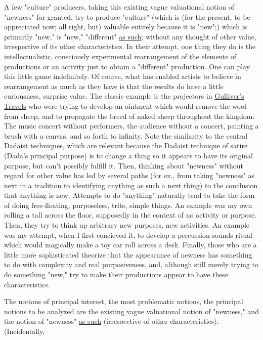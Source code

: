 A few "culture" producers, taking this existing vague
valuational notion of "newness" for granted, try to produce "culture"
(which is (for the present, to be appreciated now; all 
right, but) valuable entirely because it is "new";) which is
primarily "new," is "new," "different" \uline{as such}; without any
thought of other value, irrespective of its other characteristics.
In their attempt, one thing they do is the intellectualistic,
consciously experimental rearrangement of the elements of productions
or an activity just to obtain a "different" production.
One can play this little game indefinitely. Of course, what has
enabled artists to believe in rearrangement as much as they have
is that the results do have a little curiousness, surprise value.
The classic example is the projectors in \uline{Gulliver's Travels} who 
were trying to develop an ointment which would remove the wool
from sheep, and to propagate the breed of naked sheep throughout
the kingdom. The music concert without performers, the audience
without a concert, painting a brush with a canvas, and so forth
to infinity. Note the similarity to the central Dadaist techniques,
which are relevant because the Dadaist technique of satire (Dada's
principal purpose) is to change a thing so it appears to have its
original purpose, but can't possibly fulfill it. Then, thinking
about "newness" without regard for other value has led by several
paths (for ex., from taking "newness" as next in a tradition to
identifying anything as such a next thing) to the conclusion that
anything is new. Attempts to do "anything" naturally tend to take
the form of doing free-floating, purposeless, trite, simple things.
An example was my own rolling a tall across the floor, supposedly 
in the context of no activity or purpose. Then, they try to think
up arbitrary new purposes, new activities. An example was my 
attempt, when I first concieved it, to develop a percussion-sounds
ritual which would magically make a toy car roll across a desk. 
Finally, those who are a little more sophisticated theorize that
the appearance of newness has something to do with complexity and 
real purposiveness, and, although still merely trying to do 
something "new," try to make their productions \uline{appear} to have these characteristics.

The notions of principal interest, the most problematic 
notions, the principal notions to be analyzed are the existing
vague valuational notion of "newness," and the notion of "newness"
\uline{as such} (irresoective of other characteristics). (Incidentally, 

